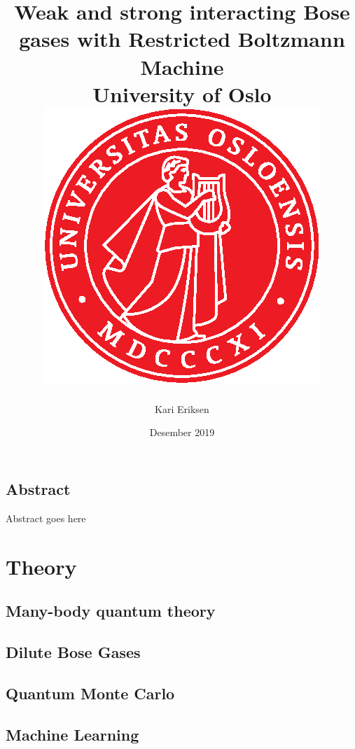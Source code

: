 \documentclass[12pt, twoside]{report}
\title{{Weak and strong interacting Bose gases with Restricted Boltzmann Machine}\\
{\large University of Oslo}\\
\includegraphics[scale=1.0]{uio_logo2.eps}
}
\author{Kari Eriksen}
\date{Desember 2019}
\begin{document}
\maketitle

\chapter*{Abstract}
Abstract goes here

\tableofcontents
 
 


%

\part{Theory}
 
\chapter{Many-body quantum theory}


\chapter{Dilute Bose Gases}

 
\chapter{Quantum Monte Carlo}

 
\chapter{Machine Learning}

\end{document}
